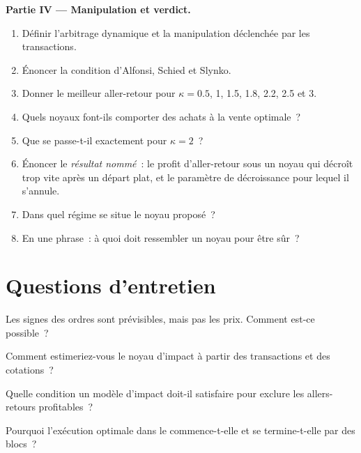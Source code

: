 \begin{problem}
\medskip\noindent\textbf{Partie IV --- Manipulation et verdict.}
\begin{enumerate}[resume]
\item Définir l'arbitrage dynamique et la manipulation déclenchée par les transactions.
\item Énoncer la condition d'Alfonsi, Schied et Slynko.
\item Donner le meilleur aller-retour pour $\kappa=0.5$, 1, 1.5, 1.8, 2.2, 2.5 et 3.
\item Quels noyaux font-ils comporter des achats à la vente optimale~?
\item Que se passe-t-il exactement pour $\kappa=2$~?
\item Énoncer le \emph{résultat nommé}~: le profit d'aller-retour sous un noyau qui décroît trop vite après un départ plat, et le paramètre de décroissance pour lequel il s'annule.
\item Dans quel régime se situe le noyau proposé~?
\item En une phrase~: à quoi doit ressembler un noyau pour être sûr~?
\end{enumerate}
\end{problem}

\section{Questions d'entretien}

\begin{interviewq}\label{iq:mx:transient-impact-and-propagator-models:1}
Les signes des ordres sont prévisibles, mais pas les prix. Comment est-ce possible~?
\end{interviewq}

\begin{interviewq}\label{iq:mx:transient-impact-and-propagator-models:2}
Comment estimeriez-vous le noyau d'impact à partir des transactions et des cotations~?
\end{interviewq}

\begin{interviewq}\label{iq:mx:transient-impact-and-propagator-models:3}
Quelle condition un modèle d'impact doit-il satisfaire pour exclure les allers-retours profitables~?
\end{interviewq}

\begin{interviewq}\label{iq:mx:transient-impact-and-propagator-models:4}
Pourquoi l'exécution optimale dans le  commence-t-elle et se termine-t-elle par des blocs~?
\end{interviewq}

